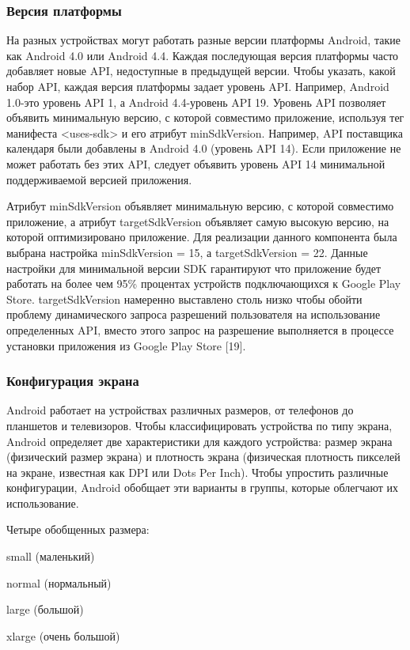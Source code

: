 \subsubsection{Версия платформы}
На разных устройствах могут работать разные версии платформы Android, такие как Android 4.0 или Android 4.4. Каждая последующая версия платформы часто добавляет новые API, недоступные в предыдущей версии. Чтобы указать, какой набор API, каждая версия платформы задает уровень API. Например, Android 1.0-это уровень API 1, а Android 4.4-уровень API 19.
Уровень API позволяет объявить минимальную версию, с которой совместимо приложение, используя тег манифеста <uses-sdk> и его атрибут minSdkVersion. Например, API поставщика календаря были добавлены в Android 4.0 (уровень API 14). Если приложение не может работать без этих API, следует объявить уровень API 14 минимальной поддерживаемой версией приложения.

Атрибут minSdkVersion объявляет минимальную версию, с которой совместимо приложение, а атрибут targetSdkVersion объявляет самую высокую версию, на которой оптимизировано приложение.
Для реализации данного компонента была выбрана настройка minSdkVersion = 15, а targetSdkVersion = 22. Данные настройки для минимальной версии SDK гарантируют что приложение будет работать на более чем 95\% процентах устройств подключающихся к Google Play Store. targetSdkVersion намеренно выставлено столь низко чтобы обойти проблему динамического запроса разрешений пользователя на использование определенных API, вместо этого запрос на разрешение выполняется в процессе установки приложения из Google Play Store [19].

\subsubsection{Конфигурация экрана}
Android работает на устройствах различных размеров, от телефонов до планшетов и телевизоров. Чтобы классифицировать устройства по типу экрана, Android определяет две характеристики для каждого устройства: размер экрана (физический размер экрана) и плотность экрана (физическая плотность пикселей на экране, известная как DPI или Dots Per Inch). Чтобы упростить различные конфигурации, Android обобщает эти варианты в группы, которые облегчают их использование.

Четыре обобщенных размера: 
\begin{my_enumerate}
\item small (маленький)
\item normal (нормальный)
\item large (большой)
\item xlarge (очень большой)
\end{my_enumerate}

